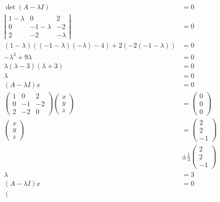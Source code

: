 \documentclass[main.tex]{subfiles}
\begin{document}
\begin{enumerate}
    $$
    \begin{aligned}
    \operatorname{det}(A-\lambda I) &=0 \\
    \left|\begin{array}{ccc}
    1-\lambda & 0 & 2 \\
    0 & -1-\lambda & -2 \\
    2 & -2 & -\lambda
    \end{array}\right| & = 0 \\
    (1-\lambda)((-1-\lambda)(-\lambda)-4)+2(-2(-1-\lambda)) &=0 \\
    -\lambda^{3}+9 \lambda &=0\\
    \lambda(\lambda-3)(\lambda+3) &=0\\
    \lambda &= 0\\
    (A-\lambda I) x&=0\\
    \left(\begin{array}{ccc}
    1 & 0 & 2 \\
    0 & -1 & -2 \\
    2 & -2 & 0
    \end{array}\right)\left(\begin{array}{l}
    x \\
    y \\
    z
    \end{array}\right) &=\left(\begin{array}{l}
    0 \\
    0 \\
    0
    \end{array}\right) \\
    \left(\begin{array}{l}
    x \\
    y \\
    z
    \end{array}\right) &=\left(\begin{array}{l}
    2 \\
    2 \\
    -1
    \end{array}\right)\\
    &\pm \frac{1}{3}\left(\begin{array}{l}
    2 \\
    2 \\
    -1
    \end{array}\right)\\
    \lambda &= 3\\
    (A-\lambda I) x&=0\\
    \left(\begin{array}{ccc}

\end{array}
\end{aligned}$$
\end{enumerate}
\end{document}
